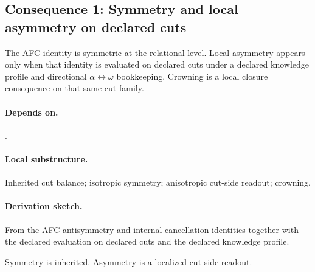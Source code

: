 \subsection{Consequence 1: Symmetry and local asymmetry on declared cuts}
\begin{consequence}\label{cons:c1}
The AFC identity is symmetric at the relational level. Local asymmetry appears only when that identity is evaluated on declared cuts under a declared knowledge profile and directional $\alpha\leftrightarrow\omega$ bookkeeping. Crowning is a local closure consequence on that same cut family.
\end{consequence}
\paragraph{Depends on.} .
\paragraph{Local substructure.} Inherited cut balance; isotropic symmetry; anisotropic cut-side readout; crowning.
\paragraph{Derivation sketch.} From the AFC antisymmetry and internal-cancellation identities together with the declared evaluation on declared cuts and the declared knowledge profile.
\begin{remarkx}
Symmetry is inherited. Asymmetry is a localized cut-side readout.
\end{remarkx}
